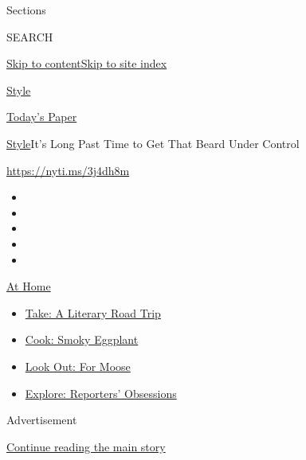 Sections

SEARCH

\protect\hyperlink{site-content}{Skip to
content}\protect\hyperlink{site-index}{Skip to site index}

\href{https://www.nytimes.com/section/style}{Style}

\href{https://myaccount.nytimes.com/auth/login?response_type=cookie\&client_id=vi}{}

\href{https://www.nytimes.com/section/todayspaper}{Today's Paper}

\href{/section/style}{Style}\textbar{}It's Long Past Time to Get That
Beard Under Control

\url{https://nyti.ms/3j4dh8m}

\begin{itemize}
\item
\item
\item
\item
\item
\end{itemize}

\href{https://www.nytimes.com/spotlight/at-home?action=click\&pgtype=Article\&state=default\&region=TOP_BANNER\&context=at_home_menu}{At
Home}

\begin{itemize}
\tightlist
\item
  \href{https://www.nytimes.com/2020/07/28/books/time-for-a-literary-road-trip.html?action=click\&pgtype=Article\&state=default\&region=TOP_BANNER\&context=at_home_menu}{Take:
  A Literary Road Trip}
\item
  \href{https://www.nytimes.com/2020/07/29/magazine/bored-with-your-home-cooking-some-smoky-eggplant-will-fix-that.html?action=click\&pgtype=Article\&state=default\&region=TOP_BANNER\&context=at_home_menu}{Cook:
  Smoky Eggplant}
\item
  \href{https://www.nytimes.com/2020/07/27/travel/moose-michigan-isle-royale.html?action=click\&pgtype=Article\&state=default\&region=TOP_BANNER\&context=at_home_menu}{Look
  Out: For Moose}
\item
  \href{https://www.nytimes.com/interactive/2020/at-home/even-more-reporters-editors-diaries-lists-recommendations.html?action=click\&pgtype=Article\&state=default\&region=TOP_BANNER\&context=at_home_menu}{Explore:
  Reporters' Obsessions}
\end{itemize}

Advertisement

\protect\hyperlink{after-top}{Continue reading the main story}

